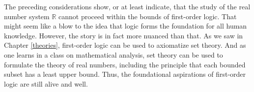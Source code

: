 The preceding considerations show, or at least indicate, that the
study of the real number system $\mathbb{R}$ cannot proceed within the
bounds of first-order logic.  That might seem like a blow to the idea
that logic forms the foundation for all human knowledge.  However, the
story is in fact more nuanced than that.  As we saw in Chapter
\ref{theories}, first-order logic can be used to axiomatize set
theory.  And as one learns in a class on mathematical analysis, set
theory can be used to formulate the theory of real numbers, including
the principle that each bounded subset has a least upper bound.  Thus,
the foundational aspirations of first-order logic are still alive and
well.







  


